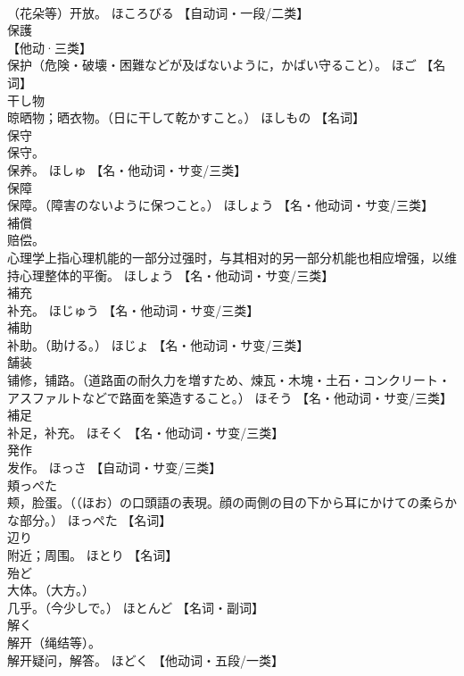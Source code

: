 \documentclass[8pt]{extreport}
\begin{document}
\begin{CJK}{UTF8}{min}
\\	（花朵等）开放。	ほころびる		【自动词・一段/二类】
\\	保護	
\\	【他动·三类】 
\\	保护（危険・破壊・困難などが及ばないように，かばい守ること）。	ほご		【名词】
\\	干し物	
\\	晾晒物；晒衣物。（日に干して乾かすこと。）	ほしもの		【名词】
\\	保守	
\\	保守。 
\\	保养。	ほしゅ		【名・他动词・サ变/三类】
\\	保障	
\\	保障。（障害のないように保つこと。）	ほしょう		【名・他动词・サ变/三类】
\\	補償	
\\	赔偿。 
\\	心理学上指心理机能的一部分过强时，与其相对的另一部分机能也相应增强，以维持心理整体的平衡。	ほしょう		【名・他动词・サ变/三类】
\\	補充	
\\	补充。	ほじゅう		【名・他动词・サ变/三类】
\\	補助	
\\	补助。（助ける。）	ほじょ		【名・他动词・サ变/三类】
\\	舗装	
\\	铺修，铺路。（道路面の耐久力を増すため、煉瓦・木塊・土石・コンクリート・アスファルトなどで路面を築造すること。）	ほそう		【名・他动词・サ变/三类】
\\	補足	
\\	补足，补充。	ほそく		【名・他动词・サ变/三类】
\\	発作	
\\	发作。	ほっさ		【自动词・サ变/三类】
\\	頬っぺた	
\\	颊，脸蛋。（（ほお）の口頭語の表現。顔の両側の目の下から耳にかけての柔らかな部分。）	ほっぺた		【名词】
\\	辺り	
\\	附近；周围。	ほとり		【名词】
\\	殆ど	
\\	大体。（大方。） 
\\	几乎。（今少しで。）	ほとんど		【名词・副词】
\\	解く	
\\	解开（绳结等）。 
\\	解开疑问，解答。	ほどく		【他动词・五段/一类】

\end{CJK}
\end{document}
